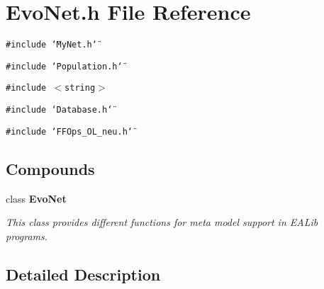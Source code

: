 \section{Evo\-Net.h File Reference}
\label{EvoNet_8h}
{\tt \#include \char`\"{}My\-Net.h\char`\"{}}\par
{\tt \#include \char`\"{}Population.h\char`\"{}}\par
{\tt \#include $<$string$>$}\par
{\tt \#include \char`\"{}Database.h\char`\"{}}\par
{\tt \#include \char`\"{}FFOps\_\-OL\_\-neu.h\char`\"{}}\par
\subsection*{Compounds}
\begin{CompactItemize}
\item 
class {\bf Evo\-Net}
\begin{CompactList}\small\item\em This class provides different functions for meta model support in EALib programs.\item\end{CompactList}\end{CompactItemize}


\subsection{Detailed Description}


